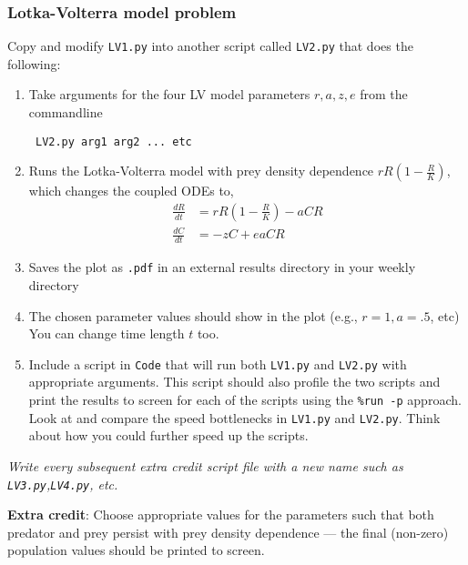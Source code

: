\subsubsection{Lotka-Volterra model problem} 

Copy and modify {\tt LV1.py} into another script called {\tt LV2.py} 
that does the following:

\begin{enumerate}
	\item Take arguments for the four LV model parameters $ r, a, z ,e$ 
	from the commandline
\begin{lstlisting}
 LV2.py arg1 arg2 ... etc
\end{lstlisting}
	\item Runs the Lotka-Volterra model with prey density dependence $r R 
	(1 - \frac{R} {K})$, which changes the coupled ODEs to,
\begin{equation}
	\begin{aligned}
	    \frac{dR}{dt} &= r R (1 - \frac{R} {K}) - a C R \\
	    \frac{dC}{dt} &= - z C + e a C R
	\end{aligned}
\end{equation}

	\item Saves the plot as {\tt .pdf} in an external results directory in your weekly directory 
	\item The chosen parameter values should show in the plot (e.g., $r = 1, a = .5 $, etc)  
You can change time length $t$ too. 
	
	\item Include a script in {\tt Code} that will run both {\tt LV1.py} 
	and {\tt LV2.py} with appropriate arguments. This script should also 
	profile the two scripts and print the results to screen for each of 
	the scripts using the {\tt \%run -p} approach. Look at and compare 
	the speed bottlenecks in {\tt LV1.py} and {\tt LV2.py}. Think about 
	how you could further speed up the scripts. 
	 
\end{enumerate}

{\it Write every subsequent extra credit script file with a new name 
such as {\tt LV3.py},{\tt LV4.py}, etc. }

{\bf Extra credit}: Choose appropriate values for the parameters such 
that both predator and prey persist with prey density dependence --- 
the final (non-zero) population values should be printed to screen. 

